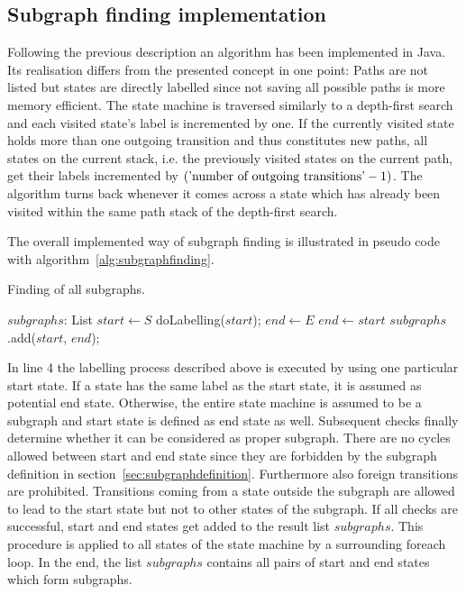 \subsection{Subgraph finding implementation}
\label{sec:subgraphfindingimplementation}

Following the previous description an algorithm has been implemented in Java. Its realisation differs from the presented concept in one point: Paths are not listed but states are directly labelled since not saving all possible paths is more memory efficient.
The state machine is traversed similarly to a depth-first search and each visited state's label is incremented by one. If the currently visited state holds more than one outgoing transition and thus constitutes new paths,  all states on the current stack, i.e. the previously visited states on the current path, get their labels incremented by $(\textnormal{'number of outgoing transitions'} - 1)$. The algorithm turns back whenever it comes across a state which has already been visited within the same path stack of the depth-first search.

The overall implemented way of subgraph finding is illustrated in pseudo code with algorithm~\ref{alg:subgraphfinding}.
\begin{algorithm}
\caption{Finding of all subgraphs.}
\label{alg:subgraphfinding}
\begin{algorithmic}[1]
\STATE $subgraphs$: List
  \STATE $start \leftarrow S$
	\STATE doLabelling($start$);
		\STATE $end \leftarrow E$
	\ELSE
		\STATE $end \leftarrow start$
	\ENDIF
		\STATE $subgraphs$.add($start$, $end$);
	\ENDIF
\ENDFOR
\end{algorithmic}
\end{algorithm}
In line 4 the labelling process described above is executed by using one particular start state. If a state has the same label as the start state, it is assumed as potential end state. Otherwise, the entire state machine is assumed to be a subgraph and start state is defined as end state as well. Subsequent checks finally determine whether it can be considered as proper subgraph.
There are no cycles allowed between start and end state since they are forbidden by the subgraph definition in section~\ref{sec:subgraphdefinition}.
Furthermore also foreign transitions are prohibited. Transitions coming from a state outside the subgraph are allowed to lead to the start state but not to other states of the subgraph. If all checks are successful, start and end states get added to the result list $subgraphs$. This procedure is applied to all states of the state machine by a surrounding foreach loop. In the end, the list $subgraphs$ contains all pairs of start and end states which form subgraphs.


